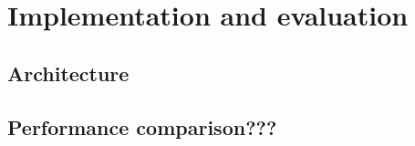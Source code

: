 
\chapter{Implementation and evaluation}
\label{cap:implementation}

\section{Architecture}
\label{sec:implementation:arch}


\section{Performance comparison???}
\label{sec:implementation:performance}